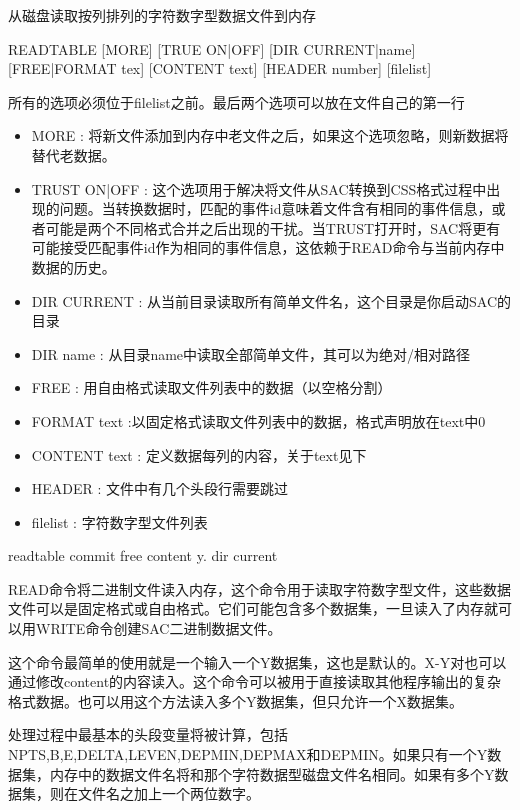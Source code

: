 \label{cmd:readtable}

从磁盘读取按列排列的字符数字型数据文件到内存

\begin{SACSTX}
READTABLE [MORE] [TRUE ON|OFF] [DIR CURRENT|name] [FREE|FORMAT tex] 
    [CONTENT text] [HEADER number] [filelist]
\end{SACSTX}
所有的选项必须位于filelist之前。最后两个选项可以放在文件自己的第一行

\begin{itemize}
\item MORE : 将新文件添加到内存中老文件之后，如果这个选项忽略，则新数据将替代老数据。
\item TRUST ON|OFF : 这个选项用于解决将文件从SAC转换到CSS格式过程中出现的问题。当转换数据时，匹配的事件id意味着文件含有相同的事件信息，或者可能是两个不同格式合并之后出现的干扰。当TRUST打开时，SAC将更有可能接受匹配事件id作为相同的事件信息，这依赖于READ命令与当前内存中数据的历史。
\item DIR CURRENT : 从当前目录读取所有简单文件名，这个目录是你启动SAC的目录 
\item DIR name : 从目录name中读取全部简单文件，其可以为绝对/相对路径 
\item FREE : 用自由格式读取文件列表中的数据（以空格分割）
\item FORMAT text :以固定格式读取文件列表中的数据，格式声明放在text中0 
\item CONTENT text : 定义数据每列的内容，关于text见下 
\item HEADER : 文件中有几个头段行需要跳过 
\item filelist : 字符数字型文件列表
\end{itemize}

\begin{SACDFT}
readtable commit free content y. dir current
\end{SACDFT}

READ命令将二进制文件读入内存，这个命令用于读取字符数字型文件，这些数据文件可以是固定格式或自由格式。它们可能包含多个数据集，一旦读入了内存就可以用WRITE命令创建SAC二进制数据文件。

这个命令最简单的使用就是一个输入一个Y数据集，这也是默认的。X-Y对也可以通过修改content的内容读入。这个命令可以被用于直接读取其他程序输出的复杂格式数据。也可以用这个方法读入多个Y数据集，但只允许一个X数据集。

处理过程中最基本的头段变量将被计算，包括NPTS,B,E,DELTA,LEVEN,DEPMIN,DEPMAX和DEPMIN。如果只有一个Y数据集，内存中的数据文件名将和那个字符数据型磁盘文件名相同。如果有多个Y数据集，则在文件名之加上一个两位数字。	

